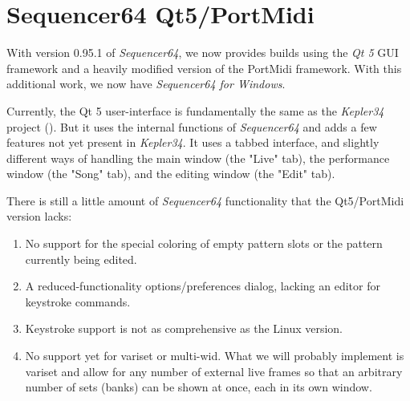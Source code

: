 %
%
%

\section{Sequencer64 Qt5/PortMidi}
\label{sec:qt_portmidi}

   With version 0.95.1 of \textsl{Sequencer64}, we now provides builds using
   the \textsl{Qt 5} GUI framework and a heavily modified version of the
   PortMidi framework.
   With this additional work, we now have
   \textsl{Sequencer64 for Windows}.

   Currently, the Qt 5 user-interface is fundamentally the same as
   the \textsl{Kepler34} project (\cite{kepler34}).
   But it uses the internal functions of \textsl{Sequencer64} and adds a few
   features not yet present in \textsl{Kepler34}.
   It uses a tabbed interface, and slightly different ways of handling the main
   window (the "Live" tab), the performance window (the "Song" tab), and the
   editing window (the "Edit" tab).

   There is still a little amount of \textsl{Sequencer64} functionality that
   the Qt5/PortMidi version lacks:

   \begin{enumerate}
      \item No support for the special coloring of empty pattern slots
         or the pattern currently being edited.
      \item A reduced-functionality options/preferences dialog, lacking an
         editor for keystroke commands.
      \item Keystroke support is not as comprehensive as the Linux version.
      \item No support yet for variset or multi-wid.  What we will probably
         implement is variset and allow for any number of external live frames
         so that an arbitrary number of sets (banks) can be shown at once,
         each in its own window.
   \end{enumerate}

